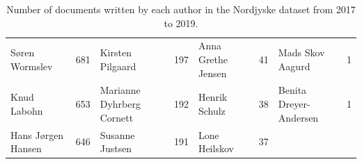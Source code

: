 \begin{table}[h]
\begin{tabular}{l|c|l|c|l|c|l|c}
		Søren Wormslev        &  681   & Kirsten Pilgaard           &  197   & Anna Grethe Jensen           &   41   & Mads Skov Aagurd             &   1    \\
		Knud Labohn           &  653   & Marianne Dyhrberg Cornett  &  192   & Henrik Schulz                &   38   & Benita Dreyer-Andersen       &   1    \\
		Hans Jørgen Hansen    &  646   & Susanne Justsen            &  191   & Lone Heilskov                &   37   &                              &        \\
		\bottomrule
	\end{tabular}
	\caption{Number of documents written by each author in the Nordjyske dataset from 2017 to 2019.}
	\label{tab:author_table}
\end{table}
